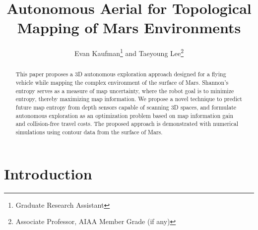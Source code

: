 \documentclass[conf]{new-aiaa}
\title{Autonomous Aerial for Topological Mapping of Mars Environments}
\author{Evan Kaufman\footnote{Graduate Research Assistant} and Taeyoung Lee\footnote{Associate Professor, AIAA Member Grade (if any)}}
\affil{Department of Mechanical and Aerospace Engineering, The George Washington University, Washington, DC, 20052}
\begin{document}
\maketitle

\begin{abstract}
This paper proposes a 3D autonomous exploration approach designed for a flying vehicle while mapping the complex environment of the surface of Mars. Shannon's entropy serves as a measure of map uncertainty, where the robot goal is to minimize entropy, thereby maximizing map information. We propose a novel technique to predict future map entropy from depth sensors capable of scanning 3D spaces, and formulate autonomous exploration as an optimization problem based on map information gain and collision-free travel costs. The proposed approach is demonstrated with numerical simulations using contour data from the surface of Mars.
\end{abstract}

%

\section{Introduction}
\end{document}
